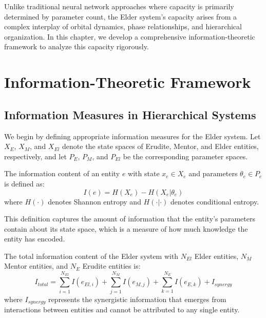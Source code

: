 Unlike traditional neural network approaches where capacity is primarily determined by parameter count, the Elder system's capacity arises from a complex interplay of orbital dynamics, phase relationships, and hierarchical organization. In this chapter, we develop a comprehensive information-theoretic framework to analyze this capacity rigorously.

\section{Information-Theoretic Framework}



\subsection{Information Measures in Hierarchical Systems}

We begin by defining appropriate information measures for the Elder system. Let $X_E$, $X_M$, and $X_{El}$ denote the state spaces of Erudite, Mentor, and Elder entities, respectively, and let $P_E$, $P_M$, and $P_{El}$ be the corresponding parameter spaces.

\begin{definition}
The information content of an entity $e$ with state $x_e \in X_e$ and parameters $\theta_e \in P_e$ is defined as:
\begin{equation}
I(e) = H(X_e) - H(X_e | \theta_e)
\end{equation}
where $H(\cdot)$ denotes Shannon entropy and $H(\cdot|\cdot)$ denotes conditional entropy.
\end{definition}

This definition captures the amount of information that the entity's parameters contain about its state space, which is a measure of how much knowledge the entity has encoded.

\begin{definition}
The total information content of the Elder system with $N_{El}$ Elder entities, $N_M$ Mentor entities, and $N_E$ Erudite entities is:
\begin{equation}
I_{total} = \sum_{i=1}^{N_{El}} I(e_{El,i}) + \sum_{j=1}^{N_M} I(e_{M,j}) + \sum_{k=1}^{N_E} I(e_{E,k}) + I_{synergy}
\end{equation}
where $I_{synergy}$ represents the synergistic information that emerges from interactions between entities and cannot be attributed to any single entity.
\end{definition}


